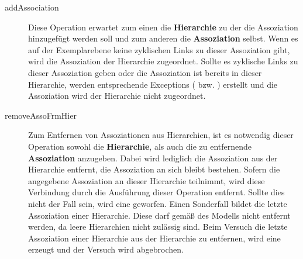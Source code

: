 \begin{description}
\item[addAssociation] Diese Operation erwartet zum einen die \textbf{Hierarchie} zu der die Assoziation hinzugefügt werden soll und zum anderen die \textbf{Assoziation} selbst.
Wenn es auf der Exemplarebene keine zyklischen Links zu dieser Assoziation gibt, wird die Assoziation der Hierarchie zugeordnet. Sollte es zyklische Links
zu dieser Assoziation geben oder die Assoziation ist bereits in dieser Hierarchie, werden entsprechende Exceptions ( bzw. ) 
erstellt und die Assoziation wird der Hierarchie nicht zugeordnet.
\item[removeAssoFrmHier] Zum Entfernen von Assoziationen aus Hierarchien, ist es notwendig dieser Operation sowohl die \textbf{Hierarchie}, als auch die zu entfernende 
\textbf{Assoziation} anzugeben. Dabei wird lediglich die Assoziation aus der Hierarchie entfernt, die Assoziation an sich bleibt bestehen. 
Sofern die angegebene Assoziation an dieser Hierarchie teilnimmt, wird diese Verbindung durch die Ausführung dieser Operation entfernt. 
Sollte dies nicht der Fall sein, wird eine  geworfen. Einen Sonderfall bildet die letzte Assoziation einer
Hierarchie. Diese darf gemäß des Modells nicht entfernt werden, da leere Hierarchien nicht zulässig sind. Beim Versuch die letzte
Assoziation einer Hierarchie aus der Hierarchie zu entfernen, wird eine  erzeugt und der Versuch wird abgebrochen. 
\end{description}
